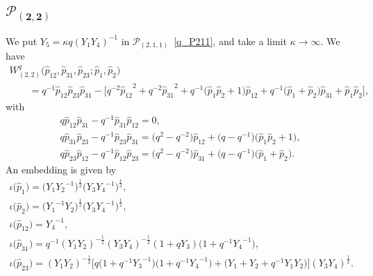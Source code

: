 \documentclass[10pt,a4paper]{amsart}
\numberwithin{equation}{section}
\begin{document}
\subsection[$\mathcal{P}_{(2,2)}$]{$\boldsymbol{\mathcal{P}_{(2,2)}}$}
We put $Y_5=\kappa q ( Y_1 Y_4 )^{-1}$ in $\mathcal{P}_{(2,1,1)}$~\eqref{q_P211}, and take a limit $\kappa\to\infty$. We have
\begin{gather*}
 W^q_{(2,2)} \big( \hat{p}_{12}, \hat{p}_{31}, \hat{p}_{23}; \hat{p}_1, \hat{p}_2\big) \\
 \qquad {}=q^{-1} \hat{p}_{12} \hat{p}_{23} \hat{p}_{31} - \big[ q^{-2} {\hat{p}_{12}}^{2} +q^{-2} {\hat{p}_{31}}^{2}
 + q^{-1} \big( \hat{p}_1 \hat{p}_2 + 1 \big) \hat{p}_{12} + q^{-1} \big( \hat{p}_1 + \hat{p}_2 \big) \hat{p}_{31} +\hat{p}_1 \hat{p}_2 \big],
\end{gather*}
with
\begin{gather*}
q \hat{p}_{12} \hat{p}_{31} - q^{-1} \hat{p}_{31} \hat{p}_{12} =0 , \\
q \hat{p}_{31} \hat{p}_{23} - q^{-1} \hat{p}_{23} \hat{p}_{31} = \big( q^2 - q^{-2} \big) \hat{p}_{12} + \big(q-q^{-1}\big) \big( \hat{p}_1 \hat{p}_2 + 1 \big) , \\
q \hat{p}_{23} \hat{p}_{12} - q^{-1} \hat{p}_{12} \hat{p}_{23} = \big( q^2 - q^{-2} \big) \hat{p}_{31} + \big(q-q^{-1}\big) \big( \hat{p}_1+ \hat{p}_2 \big) .
\end{gather*}
An embedding is given by
\begin{gather}
\iota\big(\hat{p}_1\big) = \big(Y_1 {Y_2}^{-1}\big)^{\frac{1}{2}} \big( Y_3 {Y_4}^{-1}\big)^{\frac{1}{2}} , \nonumber\\
\iota\big(\hat{p}_2\big) = \big({Y_1}^{-1} {Y_2}\big)^{\frac{1}{2}} \big( Y_3 {Y_4}^{-1}\big)^{\frac{1}{2}} , \nonumber\\
\iota\big(\hat{p}_{12}\big) = {Y_4}^{-1} , \nonumber\\
\iota\big(\hat{p}_{31}\big) = q^{-1} (Y_1 Y_2)^{-\frac{1}{2}} (Y_3 Y_4)^{-\frac{1}{2}} ( 1 + q Y_3 ) \big( 1 + q^{-1} {Y_4}^{-1} \big) , \nonumber\\
\iota\big(\hat{p}_{23}\big) = (Y_1 Y_2 )^{-\frac{1}{2}} \big[ q \big( 1 + q^{-1} {Y_3}^{-1} \big) \big( 1 + q^{-1} {Y_4}^{-1}\big) + \big( Y_1 + Y_2 + q^{-1} Y_1 Y_2 \big)\big] (Y_3 Y_4)^{\frac{1}{2}} . \label{q_P22}
\end{gather}
\end{document}
